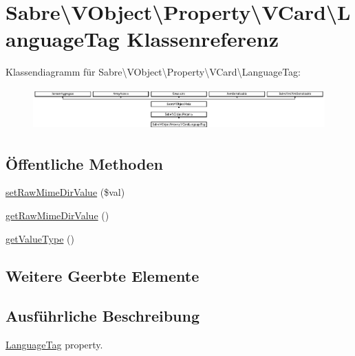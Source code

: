 \hypertarget{class_sabre_1_1_v_object_1_1_property_1_1_v_card_1_1_language_tag}{}\section{Sabre\textbackslash{}V\+Object\textbackslash{}Property\textbackslash{}V\+Card\textbackslash{}Language\+Tag Klassenreferenz}
\label{class_sabre_1_1_v_object_1_1_property_1_1_v_card_1_1_language_tag}
Klassendiagramm für Sabre\textbackslash{}V\+Object\textbackslash{}Property\textbackslash{}V\+Card\textbackslash{}Language\+Tag\+:\begin{figure}[H]
\begin{center}
\leavevmode
\includegraphics[height=1.605735cm]{class_sabre_1_1_v_object_1_1_property_1_1_v_card_1_1_language_tag}
\end{center}
\end{figure}
\subsection*{Öffentliche Methoden}
\begin{DoxyCompactItemize}
\item 
\mbox{\hyperlink{class_sabre_1_1_v_object_1_1_property_1_1_v_card_1_1_language_tag_ad9ca03a0f6306ae75120a612cb7c0933}{set\+Raw\+Mime\+Dir\+Value}} (\$val)
\item 
\mbox{\hyperlink{class_sabre_1_1_v_object_1_1_property_1_1_v_card_1_1_language_tag_abf5005a602e971d95d0985ae9e5c6e23}{get\+Raw\+Mime\+Dir\+Value}} ()
\item 
\mbox{\hyperlink{class_sabre_1_1_v_object_1_1_property_1_1_v_card_1_1_language_tag_a82e4beb4abb07a50b84fb8bba476d478}{get\+Value\+Type}} ()
\end{DoxyCompactItemize}
\subsection*{Weitere Geerbte Elemente}


\subsection{Ausführliche Beschreibung}
\mbox{\hyperlink{class_sabre_1_1_v_object_1_1_property_1_1_v_card_1_1_language_tag}{Language\+Tag}} property.

